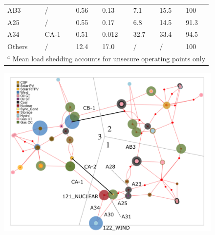 {\begin{landscape}
\begin{figure}
\begin{minipage}{\linewidth}
\begin{minipage}[c]{0.58\linewidth}
\begin{tabular}{@{}lllllll@{}}
    AB3    & /         & 0.56 & 0.13    & 7.1  & 15.5 & 100  \\
    A25    & /         & 0.55 & 0.17    & 6.8  & 14.5 & 91.3 \\
    A34    & CA-1      & 0.51 & 0.012   & 32.7 & 33.4 & 94.5 \\
    Others & /         & 12.4 & 17.0    & /    & /    & 100  \\ \bottomrule
    \multicolumn{7}{l}{\(^a\) Mean load shedding accounts for unsecure operating points only} \\
    \end{tabular}
  \label{tab:critical_contingencies}
\end{minipage}
\hfill
\begin{minipage}[c]{0.42\linewidth}
  \strut\vspace*{-\baselineskip}\newline %
  \centering
  \includegraphics[width=0.8\linewidth]{Figs/RTS.png}
  \label{fig:RTS-copy}
\end{minipage}
\end{minipage}
\end{figure}



\end{landscape}}
